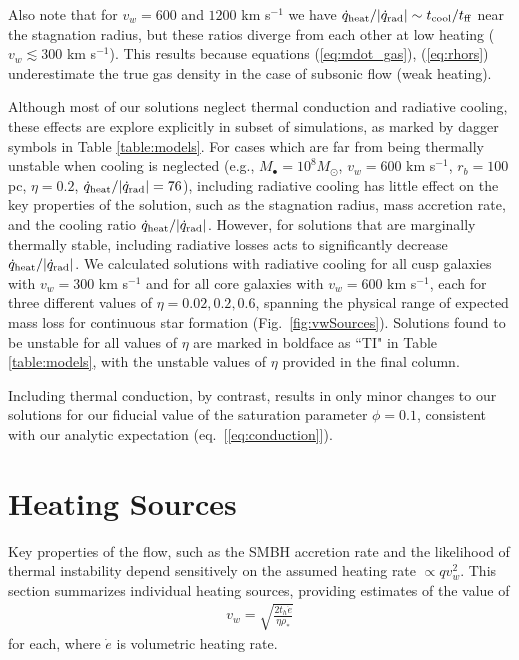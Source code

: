 \documentclass[usenatbib,fleqn]{mn2e}
\newcommand{\rhostar}{\rho_*}
\begin{document}
Also note that for $v_{w}=600$ and $1200$ km s$^{-1}$ we have $\dot{q}_{\rm heat}/|\dot{q}_{\rm rad}| \sim t_{\rm cool}/t_{\rm ff}$
near the stagnation radius, but these ratios diverge from each other at low heating ($v_{w} \lesssim 300$ km s$^{-1}$).  This results because equations (\ref{eq:mdot_gas}), (\ref{eq:rhors}) underestimate the true gas density in the case of subsonic flow (weak heating).

Although most of our solutions neglect thermal conduction and
radiative cooling, these effects are explore explicitly in subset of simulations, as marked by dagger symbols in Table \ref{table:models}.  For cases which are far from being thermally
unstable when cooling is neglected (e.g., $M_{\bullet} =
10^{8}M_{\odot}$, $v_{w} = 600$ km s$^{-1}$, $r_{b} = 100$ pc, $\eta =
0.2$, $\dot{q}_{\rm heat}/|\dot{q}_{\rm rad}| = 76$), including radiative cooling has little effect on the key properties of the solution, such as the stagnation radius, mass accretion rate, and the cooling ratio $\dot{q}_{\rm
  heat}/|\dot{q}_{\rm rad}|$.  However, for solutions that are marginally thermally stable, including radiative losses acts to significantly decrease $\dot{q}_{\rm heat}/|\dot{q}_{\rm rad}|$.  We calculated solutions with radiative
cooling for all cusp galaxies with $v_w=300$ km s$^{-1}$ and for all
core galaxies with $v_w=600 $ km s$^{-1}$, each for three different
values of $\eta = 0.02, 0.2, 0.6$, spanning the physical range of
expected mass loss for continuous star formation (Fig.~\ref{fig:vwSources}).  Solutions found to be unstable for all values of $\eta$ are marked in boldface as ``TI" in Table
\ref{table:models}, with the unstable values of $\eta$ provided in the final column.

Including thermal conduction, by contrast, results in only minor changes to our solutions for our fiducial value of the saturation parameter $\phi = 0.1$, consistent with our analytic expectation (eq.~[\ref{eq:conduction}]).  

\section{Heating Sources}
\label{sec:heating}

Key properties of the flow, such as the SMBH accretion rate and the likelihood of thermal instability depend sensitively on the assumed heating rate $\propto qv_{w}^{2}$.  This section summarizes individual heating sources, providing estimates of the value of
\begin{align}
  v_{w} = \sqrt{\frac{2 t_h \dot{e}}{\eta \rhostar}}
  \label{eq:vw_eff}
\end{align}
for each, where $\dot{e}$ is volumetric heating rate.  
\end{document}
